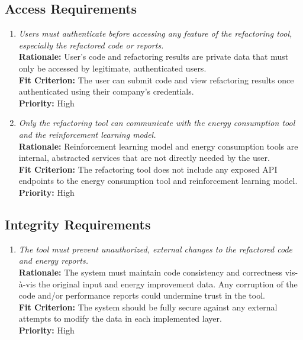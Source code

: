 \documentclass[12pt]{article}
\begin{document}
\subsection{Access Requirements}
\begin{enumerate}[label=SR-AR \arabic*., wide=0pt, leftmargin=*]
	\item \emph{Users must authenticate before accessing any feature of the refactoring tool, especially the refactored code or reports.}\\[2mm]
    {\bf Rationale:} User’s code and refactoring results are private data that must only be accessed by legitimate, authenticated users. \\
    {\bf Fit Criterion:} The user can submit code and view refactoring results once authenticated using their company’s credentials.\\
    {\bf Priority:} High
    \item \emph{Only the refactoring tool can communicate with the energy consumption tool and the reinforcement learning model.}\\
    {\bf Rationale:} Reinforcement learning model and energy consumption tools are internal, abstracted services that are not directly needed by the user.\\
    {\bf Fit Criterion:} The refactoring tool does not include any exposed API endpoints to the energy consumption tool and reinforcement learning model.\\
    {\bf Priority:} High
\end{enumerate}
\subsection{Integrity Requirements}
\begin{enumerate}[label=SR-IR \arabic*., wide=0pt, leftmargin=*]
	\item \emph{The tool must prevent unauthorized, external changes to the refactored code and energy reports.}\\[2mm]
    {\bf Rationale:} The system must maintain code consistency and correctness vis-à-vis the original input and energy improvement data. Any corruption of the code and/or performance reports could undermine trust in the tool.\\
    {\bf Fit Criterion:} The system should be fully secure against any external attempts to modify the data in each implemented layer.\\
    {\bf Priority:} High
\end{enumerate}
\end{document}
